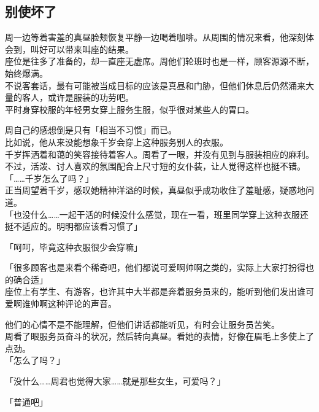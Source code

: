 \subsection{别使坏了}

周一边等着害羞的真昼脸颊恢复平静一边喝着咖啡。从周围的情况来看，他深刻体会到，叫好可以带来叫座的结果。\\

座位是往多了准备的，却一直座无虚席。周他们轮班时也是一样，顾客源源不断，始终爆满。\\

不说客套话，最有可能被当成目标的应该是真昼和门胁，但他们休息后仍然涌来大量的客人，或许是服装的功劳吧。\\

平时身穿校服的年轻男女穿上服务生服，似乎很对某些人的胃口。

周自己的感想倒是只有「相当不习惯」而已。\\

比如说，他从来没能想象千岁会穿上这种服务别人的衣服。\\

千岁挥洒着和蔼的笑容接待着客人。周看了一眼，并没有见到与服装相应的麻利。不过，活泼、讨人喜欢的氛围配合上尺寸短的女仆装，让人觉得这样也挺不错。\\

「……千岁怎么了吗？」\\

正当周望着千岁，感叹她精神洋溢的时候，真昼似乎成功收住了羞耻感，疑惑地问道。\\

「也没什么……一起干活的时候没什么感觉，现在一看，班里同学穿上这种衣服还挺不适应的。明明都应该看习惯了」

「呵呵，毕竟这种衣服很少会穿嘛」

「很多顾客也是来看个稀奇吧，他们都说可爱啊帅啊之类的，实际上大家打扮得也的确合适」\\

座位上有学生、有游客，也许其中大半都是奔着服务员来的，能听到他们发出谁可爱啊谁帅啊这种评论的声音。

他们的心情不是不能理解，但他们讲话都能听见，有时会让服务员苦笑。\\

周看了眼服务员奋斗的状况，然后转向真昼。看她的表情，好像在眉毛上多使上了点劲。\\

「怎么了吗？」

「没什么……周君也觉得大家……就是那些女生，可爱吗？」

「普通吧」\\

